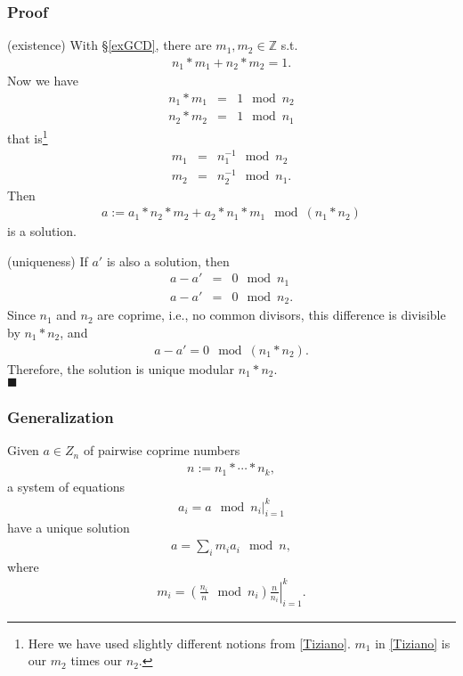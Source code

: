 \documentclass[11pt]{book}
\begin{document}
\subsubsection{Proof}
(existence) With \S\ref{exGCD}, there are $m_1,m_2 \in \mathbb{Z}$ s.t.
\begin{eqnarray}
n_1 * m_1 + n_2 * m_2 = 1.
\end{eqnarray}
Now we have
\begin{eqnarray}
n_1 * m_1 &=& 1 \mod n_2 \\
n_2 * m_2 &=& 1 \mod n_1
\end{eqnarray}
that is\footnote{
Here we have used slightly different notions from \ref{Tiziano}.
$m_1$ in \ref{Tiziano} is our $m_2$ times our $n_2$.
}
\begin{eqnarray}
m_1 &=& n_1^{-1} \mod n_2 \\
m_2 &=& n_2^{-1} \mod n_1.
\end{eqnarray}
Then
\begin{eqnarray}
a := a_1 * n_2 * m_2 + a_2 * n_1 * m_1 \mod (n_1*n_2)
\end{eqnarray}
is a solution.

(uniqueness)
If $a'$ is also a solution, then
\begin{eqnarray}
a - a' &=& 0 \mod n_1 \\
a - a' &=& 0 \mod n_2.
\end{eqnarray}
Since $n_1$ and $n_2$ are coprime, i.e., no common divisors, this difference is divisible by $n_1*n_2$, and
\begin{eqnarray}
a - a' = 0 \mod (n_1 * n_2).
\end{eqnarray}
Therefore, the solution is unique modular $n_1*n_2$. \\
$\blacksquare$

\subsubsection{Generalization}
Given $a \in Z_n$ of pairwise coprime numbers
\begin{eqnarray}
n := n_1 * \cdots * n_k,
\end{eqnarray}
a system of equations
\begin{eqnarray}
\left. a_i = a \mod n_i \right|_{i=1}^k
\end{eqnarray}
have a unique solution
\begin{eqnarray}
a = \sum_i m_i a_i \mod n,
\end{eqnarray}
where
\begin{eqnarray}
\left. m_i = \left( \frac{n_i}{n} \mod n_i \right) \frac{n}{n_i} \right|_{i=1}^k.
\end{eqnarray}
\end{document}
